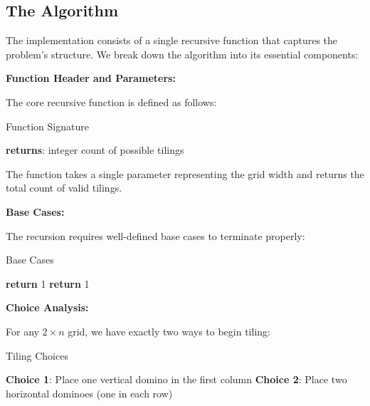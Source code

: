 \documentclass[conference]{IEEEtran}
\begin{document}
\subsection{The Algorithm}

The implementation consists of a single recursive function that captures the problem's structure. We break down the algorithm into its essential components:

\textbf{Function Header and Parameters:}

The core recursive function is defined as follows:

\begin{algorithm}[htbp]
\caption{Function Signature}
\begin{algorithmic}[1]
\State \textbf{returns}: integer count of possible tilings
\EndProcedure
\end{algorithmic}
\end{algorithm}

The function takes a single parameter representing the grid width and returns the total count of valid tilings.

\textbf{Base Cases:}

The recursion requires well-defined base cases to terminate properly:

\begin{algorithm}[htbp]
\caption{Base Cases}
\begin{algorithmic}[1]
    \State \textbf{return} 1 
\EndIf
{}
    \State \textbf{return} 1 
\EndIf
\end{algorithmic}
\end{algorithm}

\textbf{Choice Analysis:}

For any $2 \times n$ grid, we have exactly two ways to begin tiling:

\begin{algorithm}[htbp]
\caption{Tiling Choices}
\begin{algorithmic}[1]
\State \textbf{Choice 1}: Place one vertical domino in the first column
\State {}
\State \textbf{Choice 2}: Place two horizontal dominoes (one in each row)
\State {}
\end{algorithmic}
\end{algorithm}
\end{document}

